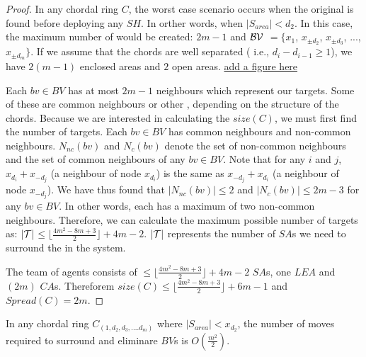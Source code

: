 \begin{proof}


In any chordal ring $C$, the worst case scenario occurs when the original \bv is found before deploying any $SH$. In orther words, 
when $|S_{area}|<d_2$. In this case, the maximum number of \bvs would be created: $ 2m-1$ and $\cal BV$ $=\{x_{1}$, $x_{\pm d_2}$, $x_{\pm d_3}$, ..., $x_{\pm d_m}\}$. If we assume that the chords are well separated ( i.e., $d_i-d_{i-1}\ge1$), we have $2(m-1)$ enclosed areas and $2$ open areas. \underline{add a figure here}

Each $bv\in BV$ has at most $2m-1$ neighbours which represent our targets. Some of these are common neighbours or other \bvs, depending on the structure of  the chords. Because we are interested in calculating the $size(C)$, we must first find the number of targets. Each $bv \in BV$ has common neighbours and non-common neighbours. $N_{nc}(bv)$ and $N_{c}(bv)$ denote the set of non-common neighbours and the set of common neighbours of any $bv \in BV$. Note that for any $i$ and $j$, $x_{d_i}+x_{-d_j}$ (a neighbour of node $x_{d_i}$) is the same as $x_{-d_j}+x_{d_i}$ (a neighbour of node $x_{-d_j}$). We have thus found that $|N_{nc}(bv)|\leq2$ and $|N_{c}(bv)|\leq 2m-3$ for any $bv \in BV$. In other words, each \bv has a maximum of two non-common neighbours.  Therefore, we can calculate the maximum possible number of targets as: $|\cal T|$$\leq \lfloor \frac {4m^2-8m+3}{2} \rfloor +4m-2$. $|\cal T|$ represents the number of $SA$s we need to surround the \bvs in the system.

The team of agents  consists of $\leq \lfloor \frac {4m^2-8m+3}{2} \rfloor +4m-2$ $SA$s, one $LEA$ and $(2m)$ $CA$s. Thereforem $size(C)\leq  \lfloor \frac {4m^2-8m+3}{2} \rfloor +6m-1$ and $Spread(C)=2m$.

\end{proof}


\begin{theorem}

In any chordal ring  $C_(1,d_2,d_3,....d_m)$ where $\left\vert{S_{area}}\right\vert < x_{d_2}$,  the number of moves required to surround and eliminare $BV$s  is $O(\frac {m^2} { 2})$.
\end{theorem}


